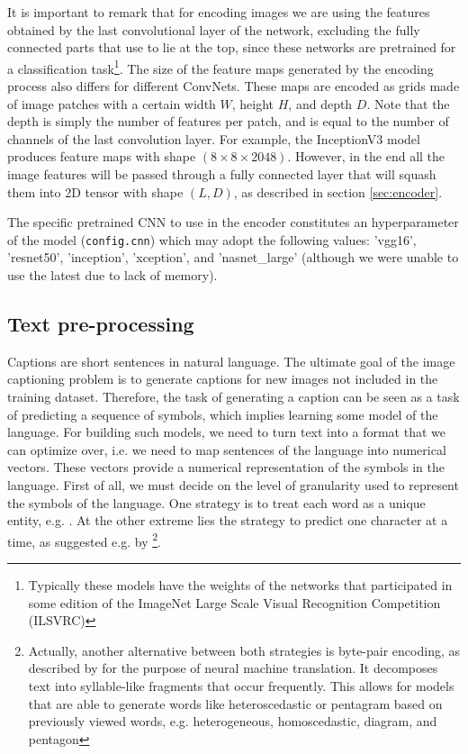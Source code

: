It is important to remark that for encoding images we are using the features obtained by the last convolutional layer of the network, excluding the fully connected parts that use to lie at the top, since these networks are pretrained for a classification task\footnote{Typically these models have the weights of the networks that participated in some edition of the ImageNet Large Scale Visual Recognition Competition (ILSVRC)}.
The size of the feature maps generated by the encoding process also differs for different ConvNets. These maps are encoded as grids made of image patches with a certain width $W$, height $H$, and depth $D$. Note that the depth is simply the number of features per patch, and is equal to the number of channels of the last convolution layer. For example, the InceptionV3 model produces feature maps with shape $(8 \times 8 \times 2048)$. However, in the end all the image features will be passed through a fully connected layer that will squash them into 2D tensor with shape $(L,D)$, as described in section \cref{sec:encoder}. 

The specific pretrained CNN to use in the encoder constitutes an hyperparameter of the model (\lstinline{config.cnn}) which may adopt the following values: 'vgg16', 'resnet50', 'inception', 'xception', and 'nasnet\_large' (although we were unable to use the latest due to lack of memory).

\subsection{Text pre-processing}

Captions are short sentences in natural language. The ultimate goal of the image captioning problem is to generate captions for new images not included in the training dataset. Therefore, the task of generating a caption can be seen as a task of predicting a sequence of symbols, which implies learning some model of the language. For building such models, we need to turn text into a format that we can optimize over, i.e. we need to map sentences of the language into numerical vectors. These vectors provide a numerical representation of the symbols in the language. First of all, we must decide on the level of granularity used to represent the symbols of the language. One strategy is to treat each word as a unique entity, e.g. \citep{Salton1975}. At the other extreme lies the strategy to predict one character at a time, as suggested e.g. by \citet{Ling2015} \footnote{Actually, another alternative between both strategies is byte-pair encoding, as described by \citet{Sennrich2016} for the purpose of neural machine translation. It decomposes text into syllable-like fragments that occur frequently. This allows for models that are able to generate words like heteroscedastic or pentagram based on previously viewed words, e.g. heterogeneous, homoscedastic, diagram, and pentagon}. 

